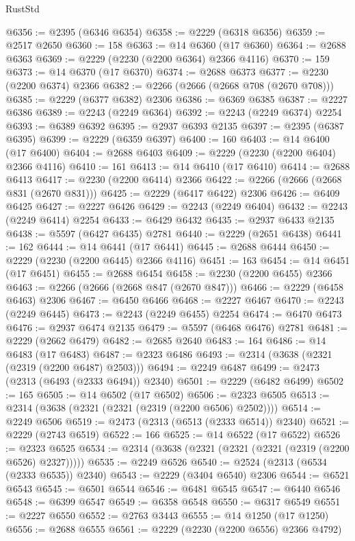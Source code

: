 \begin{lexlean}{RustStd}
\begin{coremodule}
@6356 := @2395 (@6346 @6354)
@6358 := @2229 (@6318 @6356)
@6359 := @2517 @2650
@6360 := 158
@6363 := @14 @6360 (@17 @6360)
@6364 := @2688 @6363
@6369 := @2229 (@2230 (@2200 @6364) @2366 @4116)
@6370 := 159
@6373 := @14 @6370 (@17 @6370)
@6374 := @2688 @6373
@6377 := @2230 (@2200 @6374) @2366
@6382 := @2266 (@2666 (@2668 @708 (@2670 @708)))
@6385 := @2229 (@6377 @6382) @2306
@6386 := @6369 @6385
@6387 := @2227 @6386
@6389 := @2243 (@2249 @6364)
@6392 := @2243 (@2249 @6374) @2254
@6393 := @6389 @6392
@6395 := @2937 @6393 @2135
@6397 := @2395 (@6387 @6395)
@6399 := @2229 (@6359 @6397)
@6400 := 160
@6403 := @14 @6400 (@17 @6400)
@6404 := @2688 @6403
@6409 := @2229 (@2230 (@2200 @6404) @2366 @4116)
@6410 := 161
@6413 := @14 @6410 (@17 @6410)
@6414 := @2688 @6413
@6417 := @2230 (@2200 @6414) @2366
@6422 := @2266 (@2666 (@2668 @831 (@2670 @831)))
@6425 := @2229 (@6417 @6422) @2306
@6426 := @6409 @6425
@6427 := @2227 @6426
@6429 := @2243 (@2249 @6404)
@6432 := @2243 (@2249 @6414) @2254
@6433 := @6429 @6432
@6435 := @2937 @6433 @2135
@6438 := @5597 (@6427 @6435) @2781
@6440 := @2229 (@2651 @6438)
@6441 := 162
@6444 := @14 @6441 (@17 @6441)
@6445 := @2688 @6444
@6450 := @2229 (@2230 (@2200 @6445) @2366 @4116)
@6451 := 163
@6454 := @14 @6451 (@17 @6451)
@6455 := @2688 @6454
@6458 := @2230 (@2200 @6455) @2366
@6463 := @2266 (@2666 (@2668 @847 (@2670 @847)))
@6466 := @2229 (@6458 @6463) @2306
@6467 := @6450 @6466
@6468 := @2227 @6467
@6470 := @2243 (@2249 @6445)
@6473 := @2243 (@2249 @6455) @2254
@6474 := @6470 @6473
@6476 := @2937 @6474 @2135
@6479 := @5597 (@6468 @6476) @2781
@6481 := @2229 (@2662 @6479)
@6482 := @2685 @2640
@6483 := 164
@6486 := @14 @6483 (@17 @6483)
@6487 := @2323 @6486
@6493 := @2314 (@3638 (@2321 (@2319 (@2200 @6487) @2503)))
@6494 := @2249 @6487
@6499 := @2473 (@2313 (@6493 (@2333 @6494)) @2340)
@6501 := @2229 (@6482 @6499)
@6502 := 165
@6505 := @14 @6502 (@17 @6502)
@6506 := @2323 @6505
@6513 := @2314 (@3638 (@2321 (@2321 (@2319 (@2200 @6506) @2502))))
@6514 := @2249 @6506
@6519 := @2473 (@2313 (@6513 (@2333 @6514)) @2340)
@6521 := @2229 (@2743 @6519)
@6522 := 166
@6525 := @14 @6522 (@17 @6522)
@6526 := @2323 @6525
@6534 := @2314 (@3638 (@2321 (@2321 (@2321 (@2319 (@2200 @6526) @2327)))))
@6535 := @2249 @6526
@6540 := @2524 (@2313 (@6534 (@2333 @6535)) @2340)
@6543 := @2229 (@3404 @6540) @2306
@6544 := @6521 @6543
@6545 := @6501 @6544
@6546 := @6481 @6545
@6547 := @6440 @6546
@6548 := @6399 @6547
@6549 := @6358 @6548
@6550 := @6317 @6549
@6551 := @2227 @6550
@6552 := @2763 @3443
@6555 := @14 @1250 (@17 @1250)
@6556 := @2688 @6555
@6561 := @2229 (@2230 (@2200 @6556) @2366 @4792)

\end{coremodule}
\end{lexlean}
